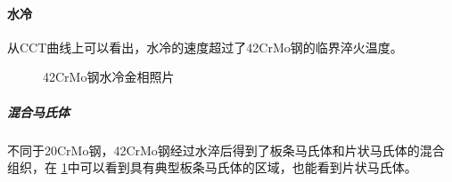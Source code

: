 \documentclass[12pt]{ctexart}
\begin{document}
\paragraph{水冷}
从CCT曲线上可以看出，水冷的速度超过了42CrMo钢的临界淬火温度。
\begin{figure}[ht!]
  \centering
  \caption{42CrMo钢水冷金相照片}
  \label{42water}
\end{figure}
\subparagraph{混合马氏体}
不同于20CrMo钢，42CrMo钢经过水淬后得到了板条马氏体和片状马氏体的混合组织，在 \ref{42water}中可以看到具有典型板条马氏体的区域，也能看到片状马氏体。
\end{document}
